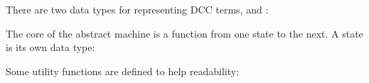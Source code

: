 There are two data types for representing DCC terms,  and :

\begin{comment}
data Value = Var Char
  | Abs Char Expr
  | Prompt Int
  
data Expr = Val Value 
  | App Expr Expr
  | Hole
  | PushPrompt Expr Expr
  | PushSubCont Expr Expr
  | WithSubCont Expr Expr
  | NewPrompt
  | Seq [Expr]
  | Sub Expr Expr Char
\end{comment}

\begin{Shaded}
\begin{Highlighting}[]
  \FunctionTok{=}  
  \FunctionTok{|}   
  \FunctionTok{|}  
  
  \FunctionTok{=}   
  \FunctionTok{|}   
  \FunctionTok{|} 
  \FunctionTok{|}   
  \FunctionTok{|}   
  \FunctionTok{|}   
  \FunctionTok{|} 
  \FunctionTok{|}  \NormalTok{[}\NormalTok{]}
  \FunctionTok{|}    
\end{Highlighting}
\end{Shaded}

The core of the abstract machine is a function from one state to the next. A state is its own data type:

\begin{comment}
data State = State Expr Expr [Expr] Value
\end{comment}

\begin{Shaded}
\begin{Highlighting}[]
  \FunctionTok{=}    \NormalTok{[}\NormalTok{] }
\end{Highlighting}
\end{Shaded}

Some utility functions are defined to help readability:

